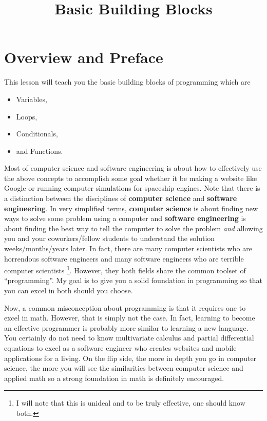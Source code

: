 \documentclass{article}
\title{Basic Building Blocks}
\begin{document}
\maketitle

\section{Overview and Preface}

This lesson will teach you the basic building blocks of programming which are
\begin{itemize}
\item Variables,
\item Loops,
\item Conditionals,
\item and Functions.
\end{itemize}
Most of computer science and software engineering is about how to effectively use the above concepts to accomplish some goal whether it be making a website like Google or running computer simulations for spaceship engines.
Note that there is a distinction between the disciplines of \textbf{computer science} and \textbf{software engineering}.
In very simplified terms, \textbf{computer science} is about finding new ways to solve some problem using a computer and \textbf{software engineering} is about finding the best way to tell the computer to solve the problem \textit{and} allowing you and your coworkers/fellow students to understand the solution weeks/months/years later.
In fact, there are many computer scientists who are horrendous software engineers and many software engineers who are terrible computer scientists \footnote{I will note that this is unideal and to be truly effective, one should know both.}.
However, they both fields share the common toolset of ``programming''.
My goal is to give you a solid foundation in programming so that you can excel in both should you choose.

Now, a common misconception about programming is that it requires one to excel in math.
However, that is simply not the case.
In fact, learning to become an effective programmer is probably more similar to learning a new language.
You certainly do not need to know multivariate calculus and partial differential equations to excel as a software engineer who creates websites and mobile applications for a living.
On the flip side, the more in depth you go in computer science, the more you will see the similarities between computer science and applied math so a strong foundation in math is definitely encouraged.
\end{document}
